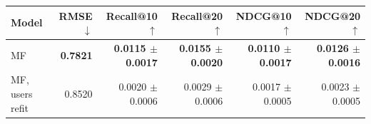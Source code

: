 \begin{tabular}{lrrrrr}
\toprule
Model & RMSE $\downarrow$ & Recall@10 $\uparrow$ & Recall@20 $\uparrow$ & NDCG@10 $\uparrow$ & NDCG@20 $\uparrow$ \\
\midrule
MF & \textbf{0.7821} & \textbf{0.0115 $\pm$ 0.0017} & \textbf{0.0155 $\pm$ 0.0020} & \textbf{0.0110 $\pm$ 0.0017} & \textbf{0.0126 $\pm$ 0.0016} \\
MF, users refit & 0.8520 & 0.0020 $\pm$ 0.0006 & 0.0029 $\pm$ 0.0006 & 0.0017 $\pm$ 0.0005 & 0.0023 $\pm$ 0.0005 \\
\bottomrule
\end{tabular}
